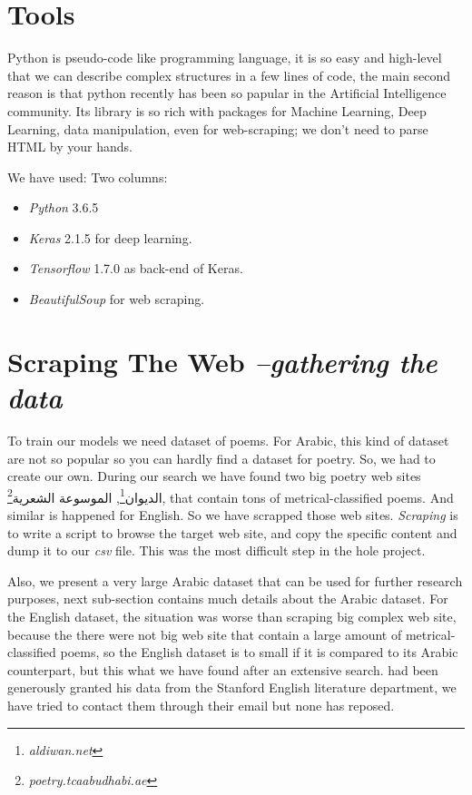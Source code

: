 \documentclass[12pt]{report}
\begin{document}
\section{Tools}
Python is pseudo-code like programming language, it is so easy and high-level
that we can describe complex structures in a few lines of code, the main second
reason is that python recently has been so papular in the Artificial Intelligence
community. Its library is so rich with packages for Machine Learning, Deep
Learning, data manipulation, even for web-scraping; we don't need to parse HTML
by your hands.

We have used:
Two columns:
\begin{itemize}
\item \textit{Python} 3.6.5
\item \textit{Keras} 2.1.5 for deep learning.
\item \textit{Tensorflow} 1.7.0 as back-end of Keras.
\item \textit{BeautifulSoup} for web scraping.
\end{itemize}







\section{Scraping The Web \textit{\small --gathering the data}}
To train our models we need dataset of poems. For Arabic, this kind of dataset
are not so popular so you can hardly find a dataset for poetry. So, we had to
create our own. During our search we have found two big poetry web sites
\textarabic{الديوان}\footnote{\textit{aldiwan.net}}, \textarabic{الموسوعة
الشعرية}\footnote{\textit{poetry.tcaabudhabi.ae}}, that
contain tons of metrical-classified poems. And similar is happened for English.
So we have scrapped those web sites. \textit{Scraping} is to write a script to
browse the target web site, and copy the specific content and dump it to our
\textit{csv} file. This was the most difficult step in the hole project. 
 
Also, we present a very large Arabic dataset that can be used for further
research purposes, next sub-section contains much details about the Arabic
dataset. For the English dataset, the situation was worse than scraping big
complex web site, because the there were not big web site that contain a large
amount of metrical-classified poems, so the English dataset is to small if it is
compared to its Arabic counterpart, but this what we have found after an
extensive search. 
\citet{farren} had been generously granted his data from the
Stanford English literature department, we have tried to contact them through
their email but none has reposed.
\end{document}
